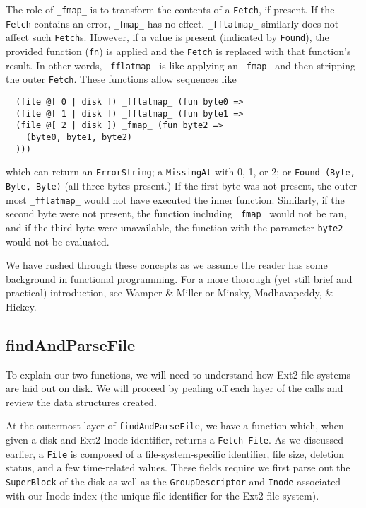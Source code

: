 \documentclass[nocopyrightspace]{sigplanconf}
\begin{document}
The role of {\tt \_fmap\_} is to transform the contents of a {\tt Fetch}, if
present. If the {\tt Fetch} contains an error, {\tt \_fmap\_} has no effect.
{\tt \_fflatmap\_} similarly does not affect such {\tt Fetch}s. However, if a
value is present (indicated by {\tt Found}), the provided function ({\tt fn})
is applied and the {\tt Fetch} is replaced with that function's result. In
other words, {\tt \_fflatmap\_} is like applying an {\tt \_fmap\_} and then
stripping the outer {\tt Fetch}. These functions allow sequences like

\begin{lstlisting}
  (file @[ 0 | disk ]) _fflatmap_ (fun byte0 =>
  (file @[ 1 | disk ]) _fflatmap_ (fun byte1 =>
  (file @[ 2 | disk ]) _fmap_ (fun byte2 =>
    (byte0, byte1, byte2)
  )))
\end{lstlisting}

which can return an {\tt ErrorString}; a {\tt MissingAt} with 0, 1, or 2; or
{\tt Found (Byte, Byte, Byte)} (all three bytes present.) If the first byte
was not present, the outer-most {\tt \_fflatmap\_} would not have executed the
inner function. Similarly, if the second byte were not present, the function
including {\tt \_fmap\_} would not be ran, and if the third byte were
unavailable, the function with the parameter {\tt byte2} would not be
evaluated.

We have rushed through these concepts as we assume the reader has some
background in functional programming. For a more thorough (yet still brief and
practical) introduction, see Wamper \& Miller\cite{scala} or Minsky,
Madhavapeddy, \& Hickey\cite{ocaml}.

\subsection{findAndParseFile}

To explain our two functions, we will need to understand how Ext2 file systems
are laid out on disk. We will proceed by pealing off each layer of the calls
and review the data structures created.

At the outermost layer of {\tt findAndParseFile}, we have a function which,
when given a disk and Ext2 Inode identifier, returns a {\tt Fetch File}. As we
discussed earlier, a {\tt File} is composed of a file-system-specific
identifier, file size, deletion status, and a few time-related values.  These
fields require we first parse out the {\tt SuperBlock} of the disk as well as
the {\tt GroupDescriptor} and {\tt Inode} associated with our Inode index (the
unique file identifier for the Ext2 file system).
\end{document}

